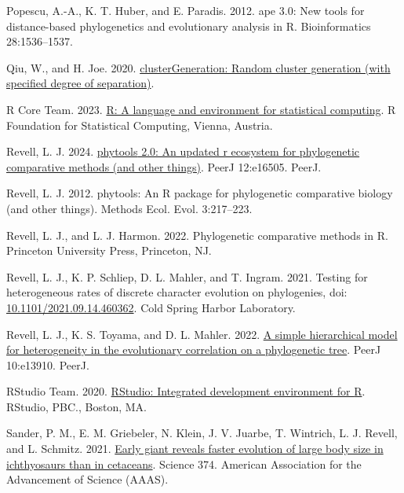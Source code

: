 \documentclass[fleqn,10pt,lineno]{wlpeerj} %
\newlength{\cslhangindent}
\newenvironment{CSLReferences}[2] %
 {\begin{list}{}{%
  \setlength{\itemindent}{0pt}
  \setlength{\leftmargin}{0pt}
  \setlength{\parsep}{0pt}
  \ifodd #1
   \setlength{\leftmargin}{\cslhangindent}
   \setlength{\itemindent}{-1\cslhangindent}
  \fi
  \setlength{\itemsep}{#2\baselineskip}}}
 {\end{list}}
\begin{document}
\begin{CSLReferences}{1}{0}
Popescu, A.-A., K. T. Huber, and E. Paradis. 2012. {ape} 3.0: New tools for distance-based phylogenetics and evolutionary analysis in {R}. Bioinformatics 28:1536--1537.

Qiu, W., and H. Joe. 2020. \href{https://CRAN.R-project.org/package=clusterGeneration}{clusterGeneration: Random cluster generation (with specified degree of separation)}.

R Core Team. 2023. \href{https://www.R-project.org/}{R: A language and environment for statistical computing}. R Foundation for Statistical Computing, Vienna, Austria.

Revell, L. J. 2024. \href{https://doi.org/10.7717/peerj.16505}{{phytools} 2.0: An updated r ecosystem for phylogenetic comparative methods (and other things)}. PeerJ 12:e16505. PeerJ.

Revell, L. J. 2012. {phytools}: An {R} package for phylogenetic comparative biology (and other things). Methods Ecol. Evol. 3:217--223.

Revell, L. J., and L. J. Harmon. 2022. Phylogenetic comparative methods in {R}. Princeton University Press, Princeton, NJ.

Revell, L. J., K. P. Schliep, D. L. Mahler, and T. Ingram. 2021. Testing for heterogeneous rates of discrete character evolution on phylogenies, doi: \href{https://doi.org/10.1101/2021.09.14.460362}{10.1101/2021.09.14.460362}. Cold Spring Harbor Laboratory.

Revell, L. J., K. S. Toyama, and D. L. Mahler. 2022. \href{https://doi.org/10.7717/peerj.13910}{A simple hierarchical model for heterogeneity in the evolutionary correlation on a phylogenetic tree}. PeerJ 10:e13910. PeerJ.

RStudio Team. 2020. \href{http://www.rstudio.com/}{R{S}tudio: Integrated development environment for {R}}. RStudio, PBC., Boston, MA.

Sander, P. M., E. M. Griebeler, N. Klein, J. V. Juarbe, T. Wintrich, L. J. Revell, and L. Schmitz. 2021. \href{https://doi.org/10.1126/science.abf5787}{Early giant reveals faster evolution of large body size in ichthyosaurs than in cetaceans}. Science 374. American Association for the Advancement of Science (AAAS).


\end{CSLReferences}
\end{document}
